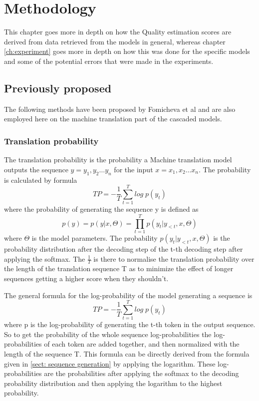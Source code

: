 
\chapter{Methodology}
\label{ch:methods}
This chapter goes more in depth on how the Quality estimation scores are derived from data retrieved from the models in general, whereas chapter \autoref{ch:experiment} goes more in depth on how this was done for the specific models and some of the potential errors that were made in the experiments.


\section{Previously proposed}
The following methods have been proposed by Fomicheva et al \cite{fomicheva2020unsupervised} and are also employed here on the machine translation part of the cascaded models.

\subsection{Translation probability}
The translation probability is the probability a Machine translation model outputs the sequence $y = y_1, y_2 \dots y_n$ for the input $x=x_1, x_2 \dots x_n$. The probability is calculated by formula $$TP=-\frac{1}{T}\sum_{t=1}^T log\; p(y_t) \label{formula:translation Probability}$$ where the probability of generating the sequence y is defined as $$ p(y)=p(y|x,\Theta)=\prod_{t=1}^T p(y_t|y_{<t}, x, \Theta)$$ where $\Theta$ is the model parameters.
The probability $p(y_t|y_{<t}, x,\Theta)$ is the probability distribution after the decoding step of the t-th decoding step after applying the softmax.
The $\frac{1}{T}$ is there to normalise the translation probability over the length of the translation sequence T as to minimize the effect of longer sequences getting a higher score when they shouldn't. 

The general formula for the log-probability of the model generating a sequence is $$TP=-\frac{1}{T}\sum_{t=1}^T log\; p(y_t)$$
where p is the log-probability of generating the t-th token in the output sequence. So to get the probability of the whole sequence log-probabilities the log-probabilities of each token are added together, and then normalized with the length of the sequence T. This formula can be directly derived from the formula given in \autoref{sect: sequence generation} by applying the logarithm. 
These log-probabilities are the probabilities after applying the softmax to the decoding probability distribution and then applying the logarithm to the highest probability.

